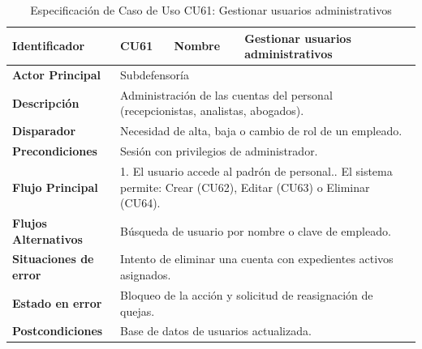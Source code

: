 \begingroup
\setlength{\parskip}{0pt}
\begin{longtable}{|p{3.5cm}|p{2cm}|p{2.5cm}|p{7cm}|}
\caption{Especificación de Caso de Uso CU61: Gestionar usuarios administrativos}
\label{tab:cu61} \\
\hline
\textbf{Identificador} & CU61 & \textbf{Nombre} & Gestionar usuarios administrativos \\ \hline
\textbf{Actor Principal} & \multicolumn{3}{p{11.5cm}|}{Subdefensoría} \\ \hline
\textbf{Descripción} & \multicolumn{3}{p{11.5cm}|}{Administración de las cuentas del personal (recepcionistas, analistas, abogados).} \\ \hline
\textbf{Disparador} & \multicolumn{3}{p{11.5cm}|}{Necesidad de alta, baja o cambio de rol de un empleado.} \\ \hline
\textbf{Precondiciones} & \multicolumn{3}{p{11.5cm}|}{Sesión con privilegios de administrador.} \\ \hline
\textbf{Flujo Principal} & \multicolumn{3}{p{11.5cm}|}{1. El usuario accede al padrón de personal.\newline 2. El sistema permite: Crear (CU62), Editar (CU63) o Eliminar (CU64).} \\ \hline
\textbf{Flujos Alternativos} & \multicolumn{3}{p{11.5cm}|}{Búsqueda de usuario por nombre o clave de empleado.} \\ \hline
\textbf{Situaciones de error} & \multicolumn{3}{p{11.5cm}|}{Intento de eliminar una cuenta con expedientes activos asignados.} \\ \hline
\textbf{Estado en error} & \multicolumn{3}{p{11.5cm}|}{Bloqueo de la acción y solicitud de reasignación de quejas.} \\ \hline
\textbf{Postcondiciones} & \multicolumn{3}{p{11.5cm}|}{Base de datos de usuarios actualizada.} \\ \hline
\end{longtable}
\endgroup

\vspace{0.8cm}

